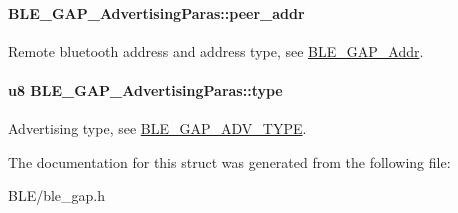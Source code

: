 \paragraph[{\texorpdfstring{peer\+\_\+addr}{peer_addr}}]{ B\+L\+E\+\_\+\+G\+A\+P\+\_\+\+Advertising\+Paras\+::peer\+\_\+addr}\hypertarget{struct_b_l_e___g_a_p___advertising_paras_aa29d4a5b0f7f58531b2eacbe2c31987a}{}\label{struct_b_l_e___g_a_p___advertising_paras_aa29d4a5b0f7f58531b2eacbe2c31987a}
Remote bluetooth address and address type, see \hyperlink{struct_b_l_e___g_a_p___addr}{B\+L\+E\+\_\+\+G\+A\+P\+\_\+\+Addr}. 
\paragraph[{\texorpdfstring{type}{type}}]{\setlength{\rightskip}{0pt plus 5cm}u8 B\+L\+E\+\_\+\+G\+A\+P\+\_\+\+Advertising\+Paras\+::type}\hypertarget{struct_b_l_e___g_a_p___advertising_paras_a3501bbd35324ea30bc78b2c0465ed087}{}\label{struct_b_l_e___g_a_p___advertising_paras_a3501bbd35324ea30bc78b2c0465ed087}
Advertising type, see \hyperlink{group___b_l_e___g_a_p___a_d_v___t_y_p_e}{B\+L\+E\+\_\+\+G\+A\+P\+\_\+\+A\+D\+V\+\_\+\+T\+Y\+PE}. 

The documentation for this struct was generated from the following file\+:\begin{DoxyCompactItemize}
\item 
B\+L\+E/ble\+\_\+gap.\+h\end{DoxyCompactItemize}
